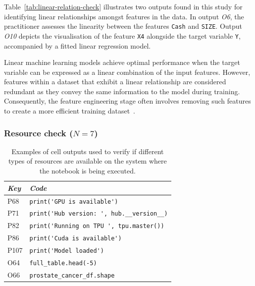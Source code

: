 Table~\ref{tab:linear-relation-check} illustrates two outputs found in this study for identifying linear relationships amongst features in the data. In output \emph{O6}, the practitioner assesses the linearity between the features \texttt{Cash} and \texttt{SIZE}. Output \emph{O10} depicts the visualisation of the feature \texttt{X4} alongside the target variable \texttt{Y}, accompanied by a fitted linear regression model.

Linear machine learning models achieve optimal performance when the target variable can be expressed as a linear combination of the input features. However, features within a dataset that exhibit a linear relationship are considered redundant as they convey the same information to the model during training. Consequently, the feature engineering stage often involves removing such features to create a more efficient training dataset~\cite{shome2022data}.


\subsubsection{Resource check ($N = 7$)}\label{sec:implicit-resource-check}

\begin{table}
  \centering
  \caption{Examples of cell outputs used to verify if different types of resources are available on the system where the notebook is being executed.}
  \begin{tabular}{@{}m{} m{}@{}}
    \toprule
    \emph{\textbf{Key}}&
    \emph{\textbf{Code}}\\
    \midrule

    P68&
    \lstinline[]$print('GPU is available')$\\

    P71&
    \lstinline[]$print('Hub version: ', hub.__version__)$\\

    P82&
    \lstinline[]$print('Running on TPU ', tpu.master())$\\

    P86&
    \lstinline[]$print('Cuda is available')$\\

    P107&
    \lstinline[]$print('Model loaded')$\\

    O64&
    \lstinline[]$full_table.head(-5)$\\

    O66&
    \lstinline[]$prostate_cancer_df.shape$\\
    \bottomrule
  \end{tabular}
  \label{tab:resource-check}
\end{table}

